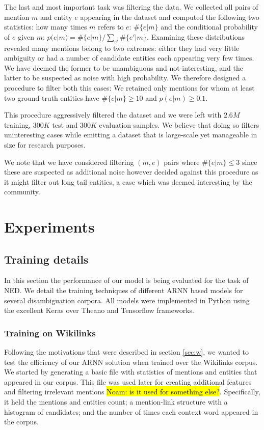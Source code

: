 \documentclass[11pt]{article}
\begin{document}
	The last and most important task was filtering the data. We collected all pairs of mention $m$ and entity $e$ appearing in the dataset and computed the following two statistics: how many times $m$ refers to $e$: $\#\{e|m\}$ and the conditional probability of $e$ given $m$: $p(e|m)=\#\{e|m\}/\sum_{e'}\#\{e'|m\}$. Examining these distributions revealed many mentions belong to two extremes: either they had very little ambiguity or had a number of candidate entities each appearing very few times. We have deemed the former to be unambiguous and not-interesting, and the latter to be suspected as noise with high probability. We therefore designed a procedure to filter both this cases: We retained only mentions for whom at least two ground-truth entities have $\#\{e|m\}\ge 10$ and $p(e|m)\ge0.1$. 
	
	This procedure aggressively filtered the dataset and we were left with $2.6M$ training, $300K$ test and $300K$ evaluation samples. We believe that doing so filters uninteresting cases while emitting a dataset that is large-scale yet manageable in size for research purposes. 
	
	We note that we have considered filtering $(m,e)$ pairs where $\#\{e|m\}\le 3$ since these are suspected as additional noise however decided against this procedure as it might filter out long tail entities, a case which was deemed interesting by the community.
	
	\section{Experiments} \label{experiments}
	
	\subsection{Training details}
	In this section the performance of our model is being evaluated for the task of NED. We detail the training techniques of different ARNN based models for several disambiguation corpora. 	All models were implemented in Python using the excellent Keras \cite{chollet2015} over Theano \cite{team2016theano} and Tensorflow \cite{tensorflow2015-whitepaper} frameworks.
	
	\subsubsection{Training on Wikilinks}
	Following the motivations that were described in section \ref{sec:w}, we wanted to test the efficiency of our ARNN solution when trained over the Wikilinks corpus.
	We started by generating a basic file with statistics of mentions and entities that appeared in our corpus. This file was used later for creating additional features and filtering irrelevant mentions \hl{Noam: is it used for something else?}. Specifically, it held the mentions and entities count; a mention-link structure with a histogram of candidates; and the number of times each context word appeared in the corpus.
\end{document}
